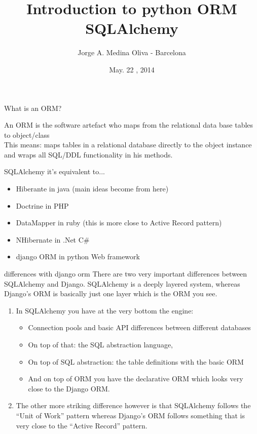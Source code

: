 \documentclass[seagull]{beamer}
\title{Introduction to python ORM SQLAlchemy}
\author{
	Jorge A. Medina Oliva - Barcelona
}
\institute{http://pybcn.org}
\date{May. 22 , 2014}
\begin{document}
\begin{frame}
\titlepage
\end{frame}


\begin{frame}{What is an ORM?}

An ORM is the software artefact who maps from the relational data base tables to object/class\\
This means: maps tables in a relational database directly to the object instance and wraps all SQL/DDL functionality in his methods.
\end{frame}

\begin{frame}{SQLAlchemy it's equivalent to...}
\begin{itemize}
	\item Hiberante in java (main ideas become from here)
	\item Doctrine in PHP
	\item DataMapper in ruby (this is more close to Active Record pattern)
	\item NHibernate in .Net C\#
	\item django ORM in python Web framework
\end{itemize}
\end{frame}

\begin{frame}{differences with django orm}
	There are two very important differences between SQLAlchemy and Django. SQLAlchemy is a deeply layered 	system, whereas Django's ORM is basically just one layer which is the ORM you see. 
	\begin{enumerate}
	\item In SQLAlchemy you have at the very bottom the engine:
		\begin{itemize}
			\item Connection pools and basic API differences between different databases
			\item On top of that: the SQL abstraction language,
			\item On top of SQL abstraction: the table definitions with the basic ORM 
			\item And on top of ORM you have the declarative ORM which looks very close to the Django ORM. 
		\end{itemize}
	\item The other more striking difference however is that SQLAlchemy follows the “Unit of Work” pattern whereas Django's ORM follows something that is very close to the “Active Record” pattern.
	\end{enumerate}
\end{frame}
\end{document}
